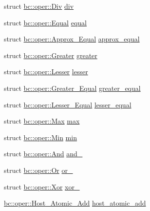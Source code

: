 \begin{DoxyCompactItemize}
\item 
struct \hyperlink{structbc_1_1oper_1_1Div}{bc\+::oper\+::\+Div} \hyperlink{namespacebc_1_1oper_a842fe83591207a9bdccea656eea9c319}{div}
\item 
struct \hyperlink{structbc_1_1oper_1_1Equal}{bc\+::oper\+::\+Equal} \hyperlink{namespacebc_1_1oper_a512ea37049135ce5d4a49c14f8a26b4c}{equal}
\item 
struct \hyperlink{structbc_1_1oper_1_1Approx__Equal}{bc\+::oper\+::\+Approx\+\_\+\+Equal} \hyperlink{namespacebc_1_1oper_ab423959a4cf314f69e5b7393450ab0df}{approx\+\_\+equal}
\item 
struct \hyperlink{structbc_1_1oper_1_1Greater}{bc\+::oper\+::\+Greater} \hyperlink{namespacebc_1_1oper_ada692f833a60b6e0de8e6e8dc3530eac}{greater}
\item 
struct \hyperlink{structbc_1_1oper_1_1Lesser}{bc\+::oper\+::\+Lesser} \hyperlink{namespacebc_1_1oper_a6086a4cf366a7fcb211e73bd0a9e596f}{lesser}
\item 
struct \hyperlink{structbc_1_1oper_1_1Greater__Equal}{bc\+::oper\+::\+Greater\+\_\+\+Equal} \hyperlink{namespacebc_1_1oper_a671b7a2b674429ccb5de5512d8659f4d}{greater\+\_\+equal}
\item 
struct \hyperlink{structbc_1_1oper_1_1Lesser__Equal}{bc\+::oper\+::\+Lesser\+\_\+\+Equal} \hyperlink{namespacebc_1_1oper_a0a4d4b963b710fdc5a6b34fc40265789}{lesser\+\_\+equal}
\item 
struct \hyperlink{structbc_1_1oper_1_1Max}{bc\+::oper\+::\+Max} \hyperlink{namespacebc_1_1oper_a54026e924e1ba487f32d89ca00d838ff}{max}
\item 
struct \hyperlink{structbc_1_1oper_1_1Min}{bc\+::oper\+::\+Min} \hyperlink{namespacebc_1_1oper_a14ab62485e33f427474770fd16d0016b}{min}
\item 
struct \hyperlink{structbc_1_1oper_1_1And}{bc\+::oper\+::\+And} \hyperlink{namespacebc_1_1oper_a953cc8d782a4f5cd2c3d3e7fd7661fa0}{and\+\_\+}
\item 
struct \hyperlink{structbc_1_1oper_1_1Or}{bc\+::oper\+::\+Or} \hyperlink{namespacebc_1_1oper_a0c17a7caafc6126a7671822bfd9ef031}{or\+\_\+}
\item 
struct \hyperlink{structbc_1_1oper_1_1Xor}{bc\+::oper\+::\+Xor} \hyperlink{namespacebc_1_1oper_a22bc35b5efc90b8534e7473dec57e2cb}{xor\+\_\+}
\item 
\hyperlink{structbc_1_1oper_1_1Host__Atomic__Add}{bc\+::oper\+::\+Host\+\_\+\+Atomic\+\_\+\+Add} \hyperlink{namespacebc_1_1oper_aca1354c2574fc3d7d6667a119b8c6b11}{host\+\_\+atomic\+\_\+add}
\item 

\end{DoxyCompactItemize}
